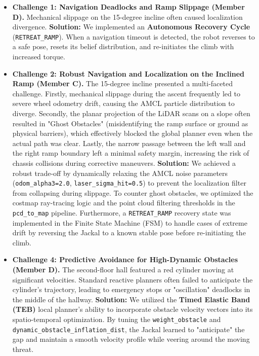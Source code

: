 \documentclass[11pt, a4paper]{article}
\begin{document}
\begin{itemize}
    \item \textbf{Challenge 1: Navigation Deadlocks and Ramp Slippage (Member D).} 
    Mechanical slippage on the 15-degree incline often caused localization divergence. \textbf{Solution:} We implemented an \textbf{Autonomous Recovery Cycle} (\texttt{RETREAT\_RAMP}). When a navigation timeout is detected, the robot reverses to a safe pose, resets its belief distribution, and re-initiates the climb with increased torque.
    
    \item \textbf{Challenge 2: Robust Navigation and Localization on the Inclined Ramp (Member C).} 
    The 15-degree incline presented a multi-faceted challenge. Firstly, mechanical slippage during the ascent frequently led to severe wheel odometry drift, causing the AMCL particle distribution to diverge. Secondly, the planar projection of the LiDAR scans on a slope often resulted in "Ghost Obstacles" (misidentifying the ramp surface or ground as physical barriers), which effectively blocked the global planner even when the actual path was clear. Lastly, the narrow passage between the left wall and the right ramp boundary left a minimal safety margin, increasing the risk of chassis collisions during corrective maneuvers.
    \textbf{Solution:} We achieved a robust trade-off by dynamically relaxing the AMCL noise parameters (\texttt{odom_alpha3=2.0}, \texttt{laser_sigma_hit=0.5}) to prevent the localization filter from collapsing during slippage. To counter ghost obstacles, we optimized the costmap ray-tracing logic and the point cloud filtering thresholds in the \texttt{pcd_to_map} pipeline. Furthermore, a \texttt{RETREAT_RAMP} recovery state was implemented in the Finite State Machine (FSM) to handle cases of extreme drift by reversing the Jackal to a known stable pose before re-initiating the climb.

    \item \textbf{Challenge 4: Predictive Avoidance for High-Dynamic Obstacles (Member D).}
    The second-floor hall featured a red cylinder moving at significant velocities. Standard reactive planners often failed to anticipate the cylinder's trajectory, leading to emergency stops or "oscillation" deadlocks in the middle of the hallway.
    \textbf{Solution:} We utilized the \textbf{Timed Elastic Band (TEB)} local planner's ability to incorporate obstacle velocity vectors into its spatio-temporal optimization. By tuning the \texttt{weight_obstacle} and \texttt{dynamic_obstacle_inflation_dist}, the Jackal learned to "anticipate" the gap and maintain a smooth velocity profile while veering around the moving threat.


\end{itemize}
\end{document}
